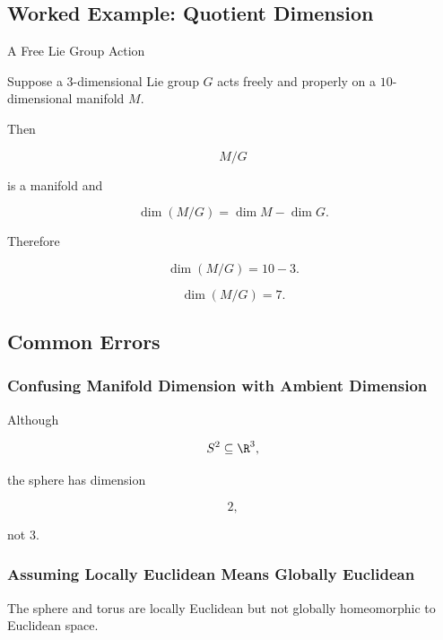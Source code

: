 \subsection{Worked Example: Quotient Dimension}
\label{subsec:worked-quotient-dimension}

\begin{workedexamplebox}{A Free Lie Group Action}

Suppose a \(3\)-dimensional Lie group \(G\) acts freely and properly on a
\(10\)-dimensional manifold \(M\).

Then

\[
M/G
\]

is a manifold and

\[
\dim(M/G)
=
\dim M-\dim G.
\]

Therefore

\[
\dim(M/G)
=
10-3.
\]

\begin{answerbox}
\[
\boxed{
\dim(M/G)=7.
}
\]
\end{answerbox}
\end{workedexamplebox}

\subsection{Common Errors}
\label{subsec:manifolds-common-errors}

\subsubsection{Confusing Manifold Dimension with Ambient Dimension}

Although

\[
S^2\subseteq\R^3,
\]

the sphere has dimension

\[
\boxed{
2,
}
\]

not \(3\).

\subsubsection{Assuming Locally Euclidean Means Globally Euclidean}

The sphere and torus are locally Euclidean but not globally homeomorphic to
Euclidean space.

